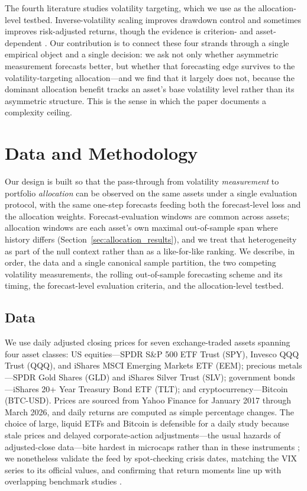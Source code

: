 The fourth literature studies volatility targeting, which we use as the allocation-level testbed. Inverse-volatility scaling improves drawdown control and sometimes improves risk-adjusted returns, though the evidence is criterion- and asset-dependent \citep{fleming2001,fleming2003,moreira2017,harvey2018,cederburg2020,bozovic2024,demiguel2024,hood2025,xu2024}. Our contribution is to connect these four strands through a single empirical object and a single decision: we ask not only whether asymmetric measurement forecasts better, but whether that forecasting edge survives to the volatility-targeting allocation---and we find that it largely does not, because the dominant allocation benefit tracks an asset's base volatility level rather than its asymmetric structure. This is the sense in which the paper documents a complexity ceiling.


\section{Data and Methodology}\label{sec:data_methodology}

Our design is built so that the pass-through from volatility \emph{measurement} to portfolio \emph{allocation} can be observed on the same assets under a single evaluation protocol, with the same one-step forecasts feeding both the forecast-level loss and the allocation weights. Forecast-evaluation windows are common across assets; allocation windows are each asset's own maximal out-of-sample span where history differs (Section~\ref{sec:allocation_results}), and we treat that heterogeneity as part of the null context rather than as a like-for-like ranking. We describe, in order, the data and a single canonical sample partition, the two competing volatility measurements, the rolling out-of-sample forecasting scheme and its timing, the forecast-level evaluation criteria, and the allocation-level testbed.

\subsection{Data}
\label{sec:data}

We use daily adjusted closing prices for seven exchange-traded assets spanning four asset classes: US equities---SPDR S\&P 500 ETF Trust (SPY), Invesco QQQ Trust (QQQ), and iShares MSCI Emerging Markets ETF (EEM); precious metals---SPDR Gold Shares (GLD) and iShares Silver Trust (SLV); government bonds---iShares 20+ Year Treasury Bond ETF (TLT); and cryptocurrency---Bitcoin (BTC-USD). Prices are sourced from Yahoo Finance for January 2017 through March 2026, and daily returns are computed as simple percentage changes. The choice of large, liquid ETFs and Bitcoin is defensible for a daily study because stale prices and delayed corporate-action adjustments---the usual hazards of adjusted-close data---bite hardest in microcaps rather than in these instruments \citep{bali2016}; we nonetheless validate the feed by spot-checking crisis dates, matching the VIX series to its official values, and confirming that return moments line up with overlapping benchmark studies \citep{moreira2017,cederburg2020}.

